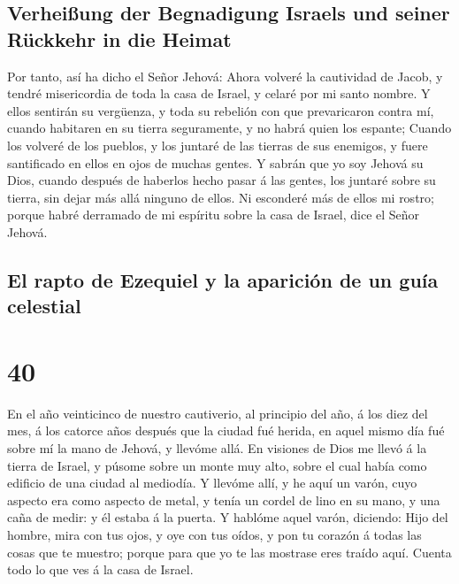 \hypertarget{verheiuxdfung-der-begnadigung-israels-und-seiner-ruxfcckkehr-in-die-heimat}{%
\subsection{Verheißung der Begnadigung Israels und seiner Rückkehr in
die
Heimat}\label{verheiuxdfung-der-begnadigung-israels-und-seiner-ruxfcckkehr-in-die-heimat}}

 Por tanto, así ha dicho el Señor Jehová: Ahora volveré
la cautividad de Jacob, y tendré misericordia de toda la casa de Israel,
y celaré por mi santo nombre.  Y ellos sentirán su
vergüenza, y toda su rebelión con que prevaricaron contra mí, cuando
habitaren en su tierra seguramente, y no habrá quien los espante;
 Cuando los volveré de los pueblos, y los juntaré de las
tierras de sus enemigos, y fuere santificado en ellos en ojos de muchas
gentes.  Y sabrán que yo soy Jehová su Dios, cuando
después de haberlos hecho pasar á las gentes, los juntaré sobre su
tierra, sin dejar más allá ninguno de ellos.  Ni
esconderé más de ellos mi rostro; porque habré derramado de mi espíritu
sobre la casa de Israel, dice el Señor Jehová.

\hypertarget{el-rapto-de-ezequiel-y-la-apariciuxf3n-de-un-guuxeda-celestial}{%
\subsection{El rapto de Ezequiel y la aparición de un guía
celestial}\label{el-rapto-de-ezequiel-y-la-apariciuxf3n-de-un-guuxeda-celestial}}

\hypertarget{section-26-40}{%
\section{40}\label{section-26-40}}

 En el año veinticinco de nuestro cautiverio, al principio
del año, á los diez del mes, á los catorce años después que la ciudad
fué herida, en aquel mismo día fué sobre mí la mano de Jehová, y llevóme
allá.  En visiones de Dios me llevó á la tierra de Israel,
y púsome sobre un monte muy alto, sobre el cual había como edificio de
una ciudad al mediodía.  Y llevóme allí, y he aquí un
varón, cuyo aspecto era como aspecto de metal, y tenía un cordel de lino
en su mano, y una caña de medir: y él estaba á la puerta. 
Y hablóme aquel varón, diciendo: Hijo del hombre, mira con tus ojos, y
oye con tus oídos, y pon tu corazón á todas las cosas que te muestro;
porque para que yo te las mostrase eres traído aquí. Cuenta todo lo que
ves á la casa de Israel.

